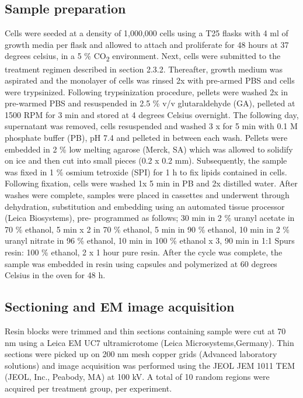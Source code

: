 \subsection{Sample preparation}
Cells were seeded at a density of 1,000,000 cells using a T25 flasks with 4 ml of growth media per flask and allowed to attach and proliferate for 48 hours at 37 degrees  celsius, in a 5 \% CO\textsubscript{2} environment. Next, cells were submitted to the treatment regimen described in section 2.3.2. Thereafter, growth medium was aspirated and the monolayer of cells was rinsed 2x with pre-armed PBS and cells were trypsinized. Following trypsinization procedure, pellets were washed 2x in pre-warmed PBS and resuspended in 2.5 \% v/v glutaraldehyde (GA), pelleted at 1500 RPM for 3 min and stored at 4 degrees Celsius overnight. The following day, supernatant was removed, cells resuspended and washed 3 x for 5 min with 0.1 M phosphate buffer (PB), pH 7.4 and pelleted in between each wash. Pellets were embedded in 2 \% low melting agarose (Merck, SA) which was allowed to solidify on ice and then cut into small pieces (0.2 x 0.2 mm). Subsequently, the sample was fixed in 1 \% osmium tetroxide (SPI) for 1 h to fix lipids contained in cells. Following fixation, cells were washed 1x 5 min in PB and 2x distilled water. After washes were complete, samples were placed in cassettes and underwent through dehydration, substitution and embedding using an automated tissue processor (Leica Biosystems), pre- programmed as follows; 30 min in 2 \% uranyl acetate in 70 \% ethanol, 5 min x 2 in 70 \% ethanol, 5 min in 90 \% ethanol, 10 min in 2 \% uranyl nitrate in 96 \% ethanol, 10 min in 100 \% ethanol x 3, 90 min in 1:1 Spurs resin: 100 \% ethanol, 2 x 1 hour pure resin. After the cycle was complete, the sample was embedded in resin using capsules and polymerized at 60 degrees Celsius in the oven for 48 h.


\subsection{Sectioning and EM image acquisition}
Resin blocks were trimmed and thin sections containing sample were cut at 70 nm using a Leica EM UC7 ultramicrotome (Leica Microsystems,Germany). Thin sections were picked up on 200 nm mesh copper grids (Advanced laboratory solutions) and image acquisition was performed using the JEOL JEM 1011 TEM (JEOL, Inc., Peabody, MA) at 100 kV. A total of 10 random regions were acquired per treatment group, per experiment.  

